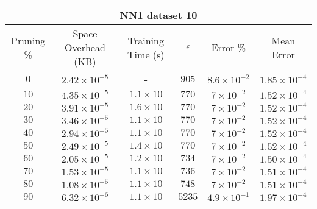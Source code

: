 \par\null\par

\begin{adjustwidth}{0cm}{}
\begin{tabular}{cccccc}
\hline
\multicolumn{6}{c}{NN1 dataset 10} \\
\toprule
Pruning \% & Space Overhead (KB) & Training Time (s) & $\epsilon$ & Error \% & Mean Error\\
\midrule
$0$ & $2.42 \times 10^{-5}$ & - & $905$ & $8.6 \times 10^{-2}$ & $1.85 \times 10^{-4}$\\
$10$ & $4.35 \times 10^{-5}$ & $1.1 \times 10$ & $770$ & $7 \times 10^{-2}$ & $1.52 \times 10^{-4}$\\
$20$ & $3.91 \times 10^{-5}$ & $1.6 \times 10$ & $770$ & $7 \times 10^{-2}$ & $1.52 \times 10^{-4}$\\
$30$ & $3.46 \times 10^{-5}$ & $1.1 \times 10$ & $770$ & $7 \times 10^{-2}$ & $1.52 \times 10^{-4}$\\
$40$ & $2.94 \times 10^{-5}$ & $1.1 \times 10$ & $770$ & $7 \times 10^{-2}$ & $1.52 \times 10^{-4}$\\
$50$ & $2.49 \times 10^{-5}$ & $1.4 \times 10$ & $770$ & $7 \times 10^{-2}$ & $1.52 \times 10^{-4}$\\
$60$ & $2.05 \times 10^{-5}$ & $1.2 \times 10$ & $734$ & $7 \times 10^{-2}$ & $1.50 \times 10^{-4}$\\
$70$ & $1.53 \times 10^{-5}$ & $1.1 \times 10$ & $736$ & $7 \times 10^{-2}$ & $1.51 \times 10^{-4}$\\
$80$ & $1.08 \times 10^{-5}$ & $1.1 \times 10$ & $748$ & $7 \times 10^{-2}$ & $1.51 \times 10^{-4}$\\
$90$ & $6.32 \times 10^{-6}$ & $1.1 \times 10$ & $5235$ & $4.9 \times 10^{-1}$ & $1.97 \times 10^{-4}$\\
\bottomrule
\end{tabular}
\end{adjustwidth}

\null\par\null

